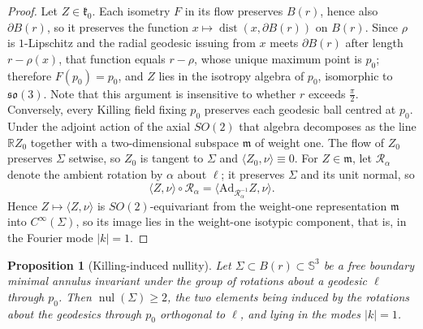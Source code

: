 \documentclass[10pt,a4paper]{amsart}
\newtheorem{proposition}[theorem]{Proposition}
\newcommand{\R}{\mathbb{R}}
\newcommand{\Sph}{\mathbb{S}}
\newcommand{\nul}{\operatorname{nul}}
\newcommand{\dist}{\operatorname{dist}}
\begin{document}
\begin{proof}
Let $Z\in\mathfrak{k}_0$. Each isometry $F$ in its flow preserves $B(r)$, hence also $\partial B(r)$, so it preserves the function $x\mapsto\dist(x,\partial B(r))$ on $B(r)$. Since $\rho$ is $1$-Lipschitz and the radial geodesic issuing from $x$ meets $\partial B(r)$ after length $r-\rho(x)$, that function equals $r-\rho$, whose unique maximum point is $p_0$; therefore $F(p_0)=p_0$, and $Z$ lies in the isotropy algebra of $p_0$, isomorphic to $\mathfrak{so}(3)$. Note that this argument is insensitive to whether $r$ exceeds $\tfrac\pi2$. Conversely, every Killing field fixing $p_0$ preserves each geodesic ball centred at $p_0$. Under the adjoint action of the axial $SO(2)$ that algebra decomposes as the line $\R Z_0$ together with a two-dimensional subspace $\mathfrak{m}$ of weight one. The flow of $Z_0$ preserves $\Sigma$ setwise, so $Z_0$ is tangent to $\Sigma$ and $\langle Z_0,\nu\rangle\equiv 0$. For $Z\in\mathfrak{m}$, let $\mathcal{R}_\alpha$ denote the ambient rotation by $\alpha$ about $\ell$; it preserves $\Sigma$ and its unit normal, so
\[
\langle Z,\nu\rangle\circ\mathcal{R}_\alpha=\langle \mathrm{Ad}_{\mathcal{R}_\alpha^{-1}}Z,\nu\rangle .
\]
Hence $Z\mapsto\langle Z,\nu\rangle$ is $SO(2)$-equivariant from the weight-one representation $\mathfrak{m}$ into $C^\infty(\Sigma)$, so its image lies in the weight-one isotypic component, that is, in the Fourier mode $|k|=1$.
\end{proof}

\begin{proposition}[Killing-induced nullity]\label{prop:killnul}
Let $\Sigma\subset B(r)\subset\Sph^3$ be a free boundary minimal annulus invariant under the group of rotations about a geodesic $\ell$ through $p_0$. Then $\nul(\Sigma)\geq 2$, the two elements being induced by the rotations about the geodesics through $p_0$ orthogonal to $\ell$, and lying in the modes $|k|=1$.
\end{proposition}
\end{document}
